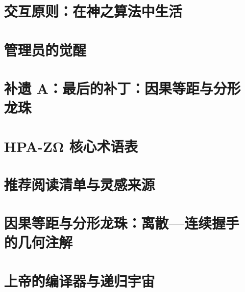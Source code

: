 \documentclass[11pt,a4paper,twoside]{book}
\begin{document}
\chapter{交互原则：在神之算法中生活}





\chapter*{管理员的觉醒}




\chapter*{补遗 A：最后的补丁：因果等距与分形龙珠}


\appendix

\chapter{HPA-ZΩ 核心术语表}


\chapter{推荐阅读清单与灵感来源}


\chapter{因果等距与分形龙珠：离散—连续握手的几何注解}


\chapter{上帝的编译器与递归宇宙}

\end{document}
